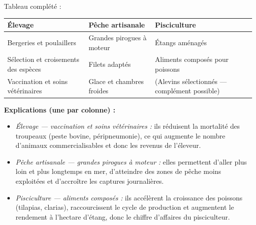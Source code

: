 \documentclass[11pt]{article}
\begin{document}
\begin{corrige}
Tableau complété :

\begin{center}
\begin{tabularx}{\linewidth}{|X|X|X|}\hline
\rowcolor{popblueL} \textbf{Élevage} & \textbf{Pêche artisanale} & \textbf{Pisciculture} \\ \hline
Bergeries et poulaillers & Grandes pirogues à moteur & Étangs aménagés \\ \hline
Sélection et croisements des espèces & Filets adaptés & Aliments composés pour poissons \\ \hline
Vaccination et soins vétérinaires & Glace et chambres froides & (Alevins sélectionnés — complément possible) \\ \hline
\end{tabularx}
\end{center}

\textbf{Explications (une par colonne) :}
\begin{itemize}
\item \emph{Élevage — vaccination et soins vétérinaires :} ils réduisent la mortalité des troupeaux (peste bovine, péripneumonie), ce qui augmente le nombre d'animaux commercialisables et donc les revenus de l'éleveur.
\item \emph{Pêche artisanale — grandes pirogues à moteur :} elles permettent d'aller plus loin et plus longtemps en mer, d'atteindre des zones de pêche moins exploitées et d'accroître les captures journalières.
\item \emph{Pisciculture — aliments composés :} ils accélèrent la croissance des poissons (tilapias, clarias), raccourcissent le cycle de production et augmentent le rendement à l'hectare d'étang, donc le chiffre d'affaires du pisciculteur.
\end{itemize}
\end{corrige}
\end{document}
